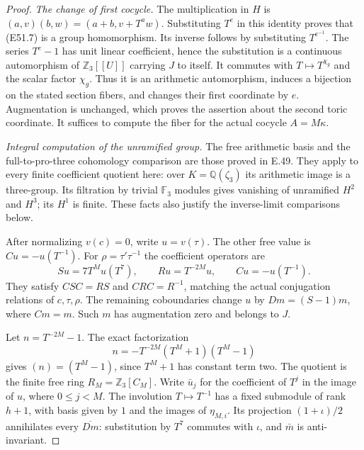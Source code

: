 \begin{proof}
\emph{The change of first cocycle.}
The multiplication in $H$ is
$(a,v)(b,w)=(a+b,v+T^a w)$. Substituting $T^e$
in this identity proves that (E51.7) is a group
homomorphism. Its inverse follows by substituting
$T^{e^{-1}}$. The series $T^e-1$ has unit linear
coefficient, hence the substitution is a continuous
automorphism of $\mathbb Z_3[[U]]$ carrying $J$ to
itself. It commutes with $T\mapsto T^{\chi_g}$
and the scalar factor $\chi_g$. Thus it is an
arithmetic automorphism, induces a bijection on
the stated section fibers, and changes their first
coordinate by $e$. Augmentation is unchanged,
which proves the assertion about the second toric
coordinate. It suffices to compute the fiber for
the actual cocycle $A=M\kappa$.

\emph{Integral computation of the unramified group.}
The free arithmetic basis and the full-to-pro-three
cohomology comparison are those proved in E.49.
They apply to every finite coefficient quotient
here: over $K=\mathbb Q(\zeta_3)$ its arithmetic
image is a three-group. Its filtration by trivial
$\mathbb F_3$ modules gives vanishing of unramified
$H^2$ and $H^3$; its $H^1$ is finite. These facts
also justify the inverse-limit comparisons below.

After normalizing $v(c)=0$, write $u=v(\tau)$.
The other free value is $Cu=-u(T^{-1})$.
For $\rho=\tau'\tau^{-1}$ the coefficient operators
are
\[
 S u=7T^M u(T^7),\qquad R u=T^{-2M}u,
             \qquad C u=-u(T^{-1}).
 \tag{E51.8}
\]
They satisfy $CSC=RS$ and $CRC=R^{-1}$, matching
the actual conjugation relations of $c,\tau,\rho$.
The remaining coboundaries change $u$ by
$Dm=(S-1)m$, where $Cm=m$. Such $m$ has
augmentation zero and belongs to $J$.

Let $n=T^{-2M}-1$. The exact factorization
\[
 n=-T^{-2M}(T^M+1)(T^M-1)
 \tag{E51.9}
\]
gives $(n)=(T^M-1)$, since $T^M+1$ has constant
term two. The quotient is the finite free ring
$R_M=\mathbb Z_3[C_M]$. Write $\bar u_j$ for
the coefficient of $T^j$ in the image of $u$,
where $0\le j<M$. The involution $T\mapsto T^{-1}$
has a fixed submodule of rank $h+1$, with basis
given by $1$ and the images of $\eta_{M,i}$.
Its projection $(1+\iota)/2$ annihilates every
$\overline{Dm}$: substitution by $T^7$ commutes
with $\iota$, and $\bar m$ is anti-invariant.


\end{proof}
